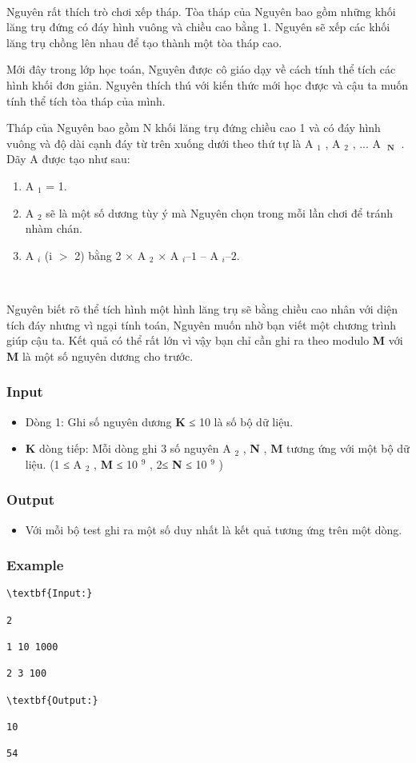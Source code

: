 

 

Nguyên rất thích trò chơi xếp tháp. Tòa tháp của Nguyên bao gồm những khối lăng trụ đứng có đáy hình vuông và chiều cao bằng 1. Nguyên sẽ xếp các khối lăng trụ chồng lên nhau để tạo thành một tòa tháp cao.

Mới đây trong lớp học toán, Nguyên được cô giáo dạy về cách tính thể tích các hình khối đơn giản. Nguyên thích thú với kiến thức mới học được và cậu ta muốn tính thể tích tòa tháp của mình.

Tháp của Nguyên bao gồm N khối lăng trụ đứng chiều cao 1 và có đáy hình vuông và độ dài cạnh đáy từ trên xuống dưới theo thứ tự là A $_ 1 $ , A­­­ $_ 2 $ , ... A­­ $_\textbf{ N }$ . Dãy A được tạo như sau:
\begin{enumerate}
	\item A $_ 1 $ = 1.
	\item A $_ 2 $ sẽ là một số dương tùy ý mà Nguyên chọn trong mỗi lần chơi để tránh nhàm chán.
	\item A $_ i $ (i $>$ 2) bằng 2 × A $_ 2 $ × A $_ i  – 1 $ – A­ $_ i – 2. $
\end{enumerate}

 

Nguyên biết rõ thể tích hình một hình lăng trụ sẽ bằng chiều cao nhân với diện tích đáy nhưng vì ngại tính toán, Nguyên muốn nhờ bạn viết một chương trình giúp cậu ta. Kết quả có thể rất lớn vì vậy bạn chỉ cần ghi ra theo modulo \textbf{ M } với \textbf{ M } là một số nguyên dương cho trước.

\subsubsection{Input}
\begin{itemize}
	\item Dòng 1: Ghi số nguyên dương \textbf{ K } ≤ 10 là số bộ dữ liệu.
	\item \textbf{K } dòng tiếp: Mỗi dòng ghi 3 số nguyên A $_ 2 $ , \textbf{ N } , \textbf{ M } tương ứng với một bộ dữ liệu. (1 ≤ A $_ 2 $ , \textbf{ M } ≤ 10 $^ 9 $ , 2≤ \textbf{ N } ≤ 10 $^ 9 $ )
\end{itemize}

\subsubsection{Output}
\begin{itemize}
	\item Với mỗi bộ test ghi ra một số duy nhất là kết quả tương ứng trên một dòng.
\end{itemize}

\subsubsection{Example}
\begin{verbatim}
\textbf{Input:}

2

1 10 1000

2 3 100

\textbf{Output:}

10

54\end{verbatim}